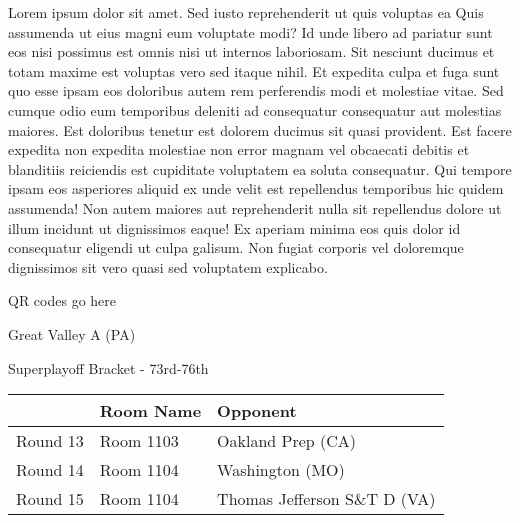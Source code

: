 \documentclass{article}%
\begin{document}
\vspace*{8pt}%
\linebreak%
\newline%
\newline%
Lorem ipsum dolor sit amet. Sed iusto reprehenderit ut quis voluptas ea Quis assumenda ut eius magni eum voluptate modi? Id unde libero ad pariatur sunt eos nisi possimus est omnis nisi ut internos laboriosam. Sit nesciunt ducimus et totam maxime est voluptas vero sed itaque nihil. Et expedita culpa et fuga sunt quo esse ipsam eos doloribus autem rem perferendis modi et molestiae vitae.\newline%
\newline%
Sed cumque odio eum temporibus deleniti ad consequatur consequatur aut molestias maiores. Est doloribus tenetur est dolorem ducimus sit quasi provident. Est facere expedita non expedita molestiae non error magnam vel obcaecati debitis et blanditiis reiciendis est cupiditate voluptatem ea soluta consequatur. Qui tempore ipsam eos asperiores aliquid ex unde velit est repellendus temporibus hic quidem assumenda!\newline%
\newline%
Non autem maiores aut reprehenderit nulla sit repellendus dolore ut illum incidunt ut dignissimos eaque! Ex aperiam minima eos quis dolor id consequatur eligendi ut culpa galisum. Non fugiat corporis vel doloremque dignissimos sit vero quasi sed voluptatem explicabo.\newline%
\newline%
%
\vspace*{30pt}%
\begin{center}%
\begin{Huge}%
QR codes go here%
\end{Huge}%
\end{center}%
\newpage%
\begin{center}%
\begin{Huge}%
Great Valley A (PA)%
\end{Huge}%
\vspace*{8pt}%
\linebreak%
\begin{Large}%
Superplayoff Bracket {-} 73rd{-}76th%
\end{Large}%
\end{center}%
%
\begin{tabularx}{\textwidth}{|c|Y|Y|}%
\hline%
&Room Name&Opponent\\%
\hline%
Round 13&Room 1103&Oakland Prep (CA)\\%
Round 14&Room 1104&Washington (MO)\\%
Round 15&Room 1104&Thomas Jefferson S\&T D (VA)\\%
\hline%
\end{tabularx}%
\end{document}
